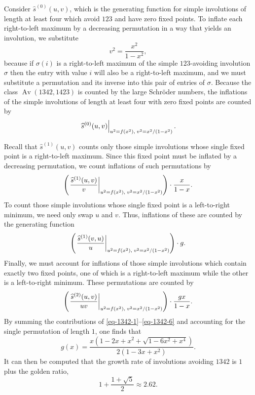 \documentclass[10pt]{article}
\theoremstyle{plain}
\newcommand{\Av}{\operatorname{Av}}
\newcommand{\ds}{\displaystyle}
\newcommand{\pa}[1]{\left({#1}\right)}
\newcommand{\f}[2]{\ds\frac{{#1}}{{#2}}}
\newcommand{\eval}[2][\right]{\relax\ifx#1\right\relax \left.\fi#2#1\rvert}
\begin{document}
Consider $\widehat{s}^{(0)}(u,v)$, which is the generating function for simple involutions of length at least four which avoid $123$ and have zero fixed points. To inflate each right-to-left maximum by a decreasing permutation in a way that yields an involution, we substitute
	\[v^2 = \f{x^2}{1-x^2},\]
because if $\sigma(i)$ is a right-to-left maximum of the simple $123$-avoiding involution $\sigma$ then the entry with value $i$ will also be a right-to-left maximum, and we must substitute a permutation and its inverse into this pair of entries of $\sigma$. Because the class $\Av(1342,1423)$ is counted by the large Schr\"oder numbers, the inflations of the simple involutions of length at least four with zero fixed points are counted by
	\begin{equation}
	\label{eq-1342-3}
	\eval{\widehat{s}^{(0)}(u,v)}_{u^2=f(x^2),\;v^2=x^2/(1-x^2)}.
	\end{equation}
	
Recall that $\widehat{s}^{(1)}(u,v)$ counts only those simple involutions whose single fixed point is a right-to-left maximum. Since this fixed point must be inflated by a decreasing permutation, we count inflations of such permutations by
	\begin{equation}
	\label{eq-1342-4}
	\pa{\eval{\f{\widehat{s}^{(1)}(u,v)}{v}}_{u^2=f(x^2),\;v^2=x^2/(1-x^2)}}
	\cdot\f{x}{1-x}.
	\end{equation}
To count those simple involutions whose single fixed point is a left-to-right minimum, we need only swap $u$ and $v$. Thus, inflations of these are counted by the generating function
	\begin{equation}
	\label{eq-1342-5}
	\pa{\eval{\f{\widehat{s}^{(1)}(v,u)}{u}}_{u^2=f(x^2),\;v^2=x^2/(1-x^2)}}\cdot g.
	\end{equation}
Finally, we must account for inflations of those simple involutions which contain exactly two fixed points, one of which is a right-to-left maximum while the other is a left-to-right minimum. These permutations are counted by 
	\begin{equation}
	\label{eq-1342-6}
	\pa{\eval{\f{\widehat{s}^{(2)}(u,v)}{uv}}_{u^2=f(x^2),\;v^2=x^2/(1-x^2)}}\cdot\f{gx}{1-x}.
	\end{equation}
By summing the contributions of \eqref{eq-1342-1}--\eqref{eq-1342-6} and accounting for the single permutation of length $1$, one finds that
	\[g(x) = \f{x\pa{1-2x+x^2+\sqrt{1-6x^2+x^4}}}{2\pa{1-3x+x^2}}.\]
It can then be computed that the growth rate of involutions avoiding $1342$ is $1$ plus the golden ratio,
	\[1+\f{1+\sqrt{5}}{2} \approx 2.62.\]
\end{document}
